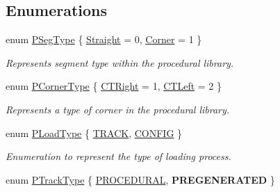\subsection*{Enumerations}
\begin{DoxyCompactItemize}
\item 
enum \hyperlink{namespaceprocedural_a50f6e9669ba957b95f24713757bd0f20}{P\-Seg\-Type} \{ \hyperlink{namespaceprocedural_a50f6e9669ba957b95f24713757bd0f20ac99b348e62298f75812a6561d4560c15}{Straight} = 0, 
\hyperlink{namespaceprocedural_a50f6e9669ba957b95f24713757bd0f20aa05063d9cf40890b9243f4035217c0d9}{Corner} = 1
 \}
\begin{DoxyCompactList}\small\item\em Represents segment type within the procedural library. \end{DoxyCompactList}\item 
enum \hyperlink{namespaceprocedural_ac5486560c59bdf79345a041628149e91}{P\-Corner\-Type} \{ \hyperlink{namespaceprocedural_ac5486560c59bdf79345a041628149e91a51e953992f324191b7293ff8fe7ce244}{C\-T\-Right} = 1, 
\hyperlink{namespaceprocedural_ac5486560c59bdf79345a041628149e91ace6190b113a7b2280f191327256f5e25}{C\-T\-Left} = 2
 \}
\begin{DoxyCompactList}\small\item\em Represents a type of corner in the procedural library. \end{DoxyCompactList}\item 
enum \hyperlink{namespaceprocedural_a1a0de85ffebb5ee366eb8374b42edac7}{P\-Load\-Type} \{ \hyperlink{namespaceprocedural_a1a0de85ffebb5ee366eb8374b42edac7a88c931bb80a6ea2db2b99a21ea648f9a}{T\-R\-A\-C\-K}, 
\hyperlink{namespaceprocedural_a1a0de85ffebb5ee366eb8374b42edac7a5c08cdbaee11dc085deb173382238ba5}{C\-O\-N\-F\-I\-G}
 \}
\begin{DoxyCompactList}\small\item\em Enumeration to represent the type of loading process. \end{DoxyCompactList}\item 
enum \hyperlink{namespaceprocedural_a4435205085ac754385168920ab245cd7}{P\-Track\-Type} \{ \hyperlink{namespaceprocedural_a4435205085ac754385168920ab245cd7abfc5b755b3f8f17336d91945d295e9f3}{P\-R\-O\-C\-E\-D\-U\-R\-A\-L}, 
{\bfseries P\-R\-E\-G\-E\-N\-E\-R\-A\-T\-E\-D}
 \}
\end{DoxyCompactItemize}
